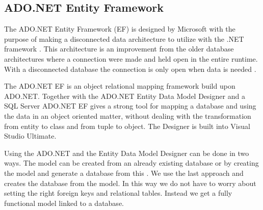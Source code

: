 \subsection{ADO.NET Entity Framework}
\label{sub:adonet}
The ADO.NET Entity Framework (EF) is designed by Microsoft with the purpose of making a disconnected data architecture to utilize with the .NET framework \cite{adonetDesignGoal}. 
This architecture is an improvement from the older database architectures where a connection were made and held open in the entire runtime. With a disconnected database the connection is only open when data is needed \cite{disconnectedData}. 

The ADO.NET EF is an object relational mapping framework \cite{adonetEntityFramework} build upon ADO.NET. 
Together with the ADO.NET Entity Data Model Designer and a SQL Server ADO.NET EF gives a strong tool for mapping a database and using the data in an object oriented matter, without dealing with the transformation from entity to class and from tuple to object. 
The Designer is built into Visual Studio Ultimate. 

Using the ADO.NET and the Entity Data Model Designer can be done in two ways. 
The model can be created from an already existing database or by creating the model and generate a database from this \cite{adonetEntityDataModelDesigner}.
We use the last approach and creates the database from the model. 
In this way we do not have to worry about setting the right foreign keys and relational tables. Instead we get a fully functional model linked to a database. 


